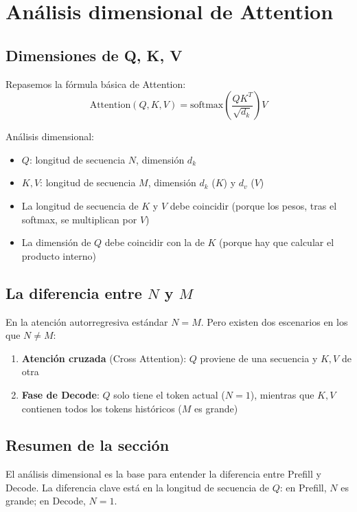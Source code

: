\section{Análisis dimensional de Attention}

\subsection{Dimensiones de Q, K, V}

Repasemos la fórmula básica de Attention:
$$
\text{Attention}(Q, K, V) = \text{softmax}\left(\frac{QK^T}{\sqrt{d_k}}\right) V
$$

Análisis dimensional:
\begin{itemize}
  \item $Q$: longitud de secuencia $N$, dimensión $d_k$
  \item $K, V$: longitud de secuencia $M$, dimensión $d_k$ ($K$) y $d_v$ ($V$)
  \item La longitud de secuencia de $K$ y $V$ debe coincidir (porque los pesos, tras el softmax, se multiplican por $V$)
  \item La dimensión de $Q$ debe coincidir con la de $K$ (porque hay que calcular el producto interno)
\end{itemize}

\subsection{La diferencia entre $N$ y $M$}

En la atención autorregresiva estándar $N = M$. Pero existen dos escenarios en los que $N \neq M$:
\begin{enumerate}
  \item \textbf{Atención cruzada} (Cross Attention): $Q$ proviene de una secuencia y $K, V$ de otra
  \item \textbf{Fase de Decode}: $Q$ solo tiene el token actual ($N=1$), mientras que $K, V$ contienen todos los tokens históricos ($M$ es grande)
\end{enumerate}

\subsection{Resumen de la sección}

El análisis dimensional es la base para entender la diferencia entre Prefill y Decode. La diferencia clave está en la longitud de secuencia de $Q$: en Prefill, $N$ es grande; en Decode, $N = 1$.

